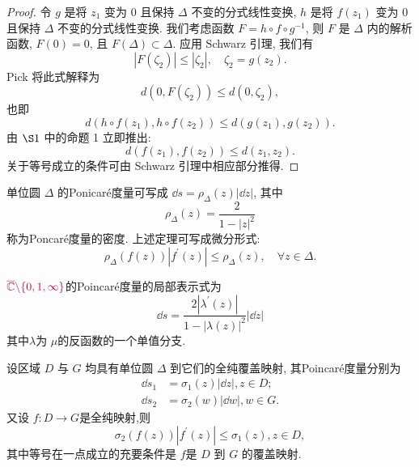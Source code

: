 \begin{proof}
    令 $g$ 是将 $z_1$ 变为 0 且保持 $\Delta$ 不变的分式线性变换, $h$ 是将 $f\left(z_1\right)$ 变为 0 且保持 $\Delta$ 不变的分式线性变换. 我们考虑函数 $F=h \circ f \circ g^{-1}$, 则 $F$ 是 $\Delta$ 内的解析函数, $F(0)=0$, 且 $F(\Delta) \subset \Delta$. 应用 Schwarz 引理, 我们有
$$
\left|F\left(\zeta_2\right)\right| \leqslant\left|\zeta_2\right|, \quad \zeta_2=g\left(z_2\right) .
$$
Pick 将此式解释为
$$
d\left(0, F\left(\zeta_2\right)\right) \leqslant d\left(0, \zeta_2\right),
$$
也即
$$
d\left(h \circ f\left(z_1\right), h \circ f\left(z_2\right)\right) \leqslant d\left(g\left(z_1\right), g\left(z_2\right)\right) .
$$
由 $\S 1$ 中的命题 1 立即推出:
$$
d\left(f\left(z_1\right), f\left(z_2\right)\right) \leqslant d\left(z_1, z_2\right) .
$$
关于等号成立的条件可由 Schwarz 引理中相应部分推得.
\end{proof}
\begin{defi}[Poincar\'{e}度量]
    {\color{magenta} 单位圆 $\Delta$ }的Ponicar\'{e}度量可写成 $\dd s=\rho_\Delta (z) |\dd z|$, 其中
    \[\rho_\Delta (z)=\frac{2}{1-|z|^2}\]
    称为Poncar\'{e}度量的密度. 上述定理可写成微分形式:
    \[\rho_\Delta (f(z))|f^\prime (z)|\leqslant \rho_\Delta (z),\quad\forall z\in \Delta.\]

    $\color{purple}{\overline{\mathbb{C}}\backslash \{0,1,\infty\}}$的Poincar\'{e}度量的局部表示式为
    \[\dd s=\frac{2|\lambda^\prime(z)|}{1-|\lambda(z)|^2}|\dd z|
    \]
    其中$\lambda$为 $\mu$的反函数的一个单值分支.
\end{defi}
\begin{thm}[广义Schwarz引理]\label{thm: extension of Schwarz lem}
    设区域 $D$ 与 $G$ 均具有单位圆 $\Delta$ 到它们的全纯覆盖映射, 其Poincar\'{e}度量分别为
    \begin{align*}
        \dd s_1 &=\sigma_1 (z) |\dd z|,z\in D;\\ 
        \dd s_2 &=\sigma_2 (w) |\dd w|,w\in G.
    \end{align*}
    又设 $f\colon D\to G$是全纯映射,则
    \[\sigma_2 (f(z))|f^\prime (z)|\leqslant \sigma_1 (z),z\in D,\]
    其中等号在一点成立的充要条件是 $f$是 $D$ 到 $G$ 的覆盖映射.
\end{thm}
